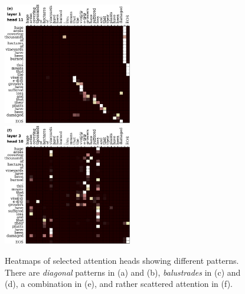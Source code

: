 \documentclass[11pt,a4paper]{article}
\newcommand{\word}{\emph{input state}\xspace}
\newcommand{\state}{\emph{output state}\xspace}
\begin{document}
\begin{figure}
\includegraphics[width=0.5\textwidth]{balustrades/hms3-n-k10-l0-e.pdf}\hspace{2mm}
\includegraphics[width=0.5\textwidth]{balustrades/hms3-n-k9-l2-e.pdf}\\
\caption{Heatmaps of selected attention heads showing different patterns.
There are \emph{diagonal} patterns in (a) and (b), \emph{balustrades} in (c) and (d), a combination in (e), and rather scattered attention in (f).}
\label{fig:heatmaps}
\end{figure}


\end{document}

